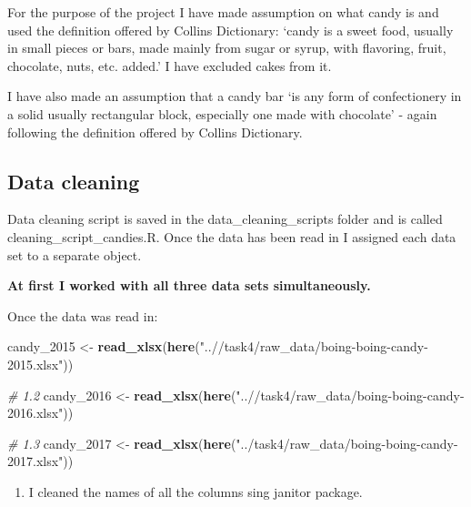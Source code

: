 \documentclass[
]{article}
\newenvironment{Shaded}{\begin{snugshade}}{\end{snugshade}}
\newcommand{\CommentTok}[1]{\textcolor[rgb]{0.56,0.35,0.01}{\textit{#1}}}
\newcommand{\FunctionTok}[1]{\textcolor[rgb]{0.13,0.29,0.53}{\textbf{#1}}}
\newcommand{\NormalTok}[1]{#1}
\newcommand{\OtherTok}[1]{\textcolor[rgb]{0.56,0.35,0.01}{#1}}
\newcommand{\StringTok}[1]{\textcolor[rgb]{0.31,0.60,0.02}{#1}}
\providecommand{\tightlist}{%
  \setlength{\itemsep}{0pt}\setlength{\parskip}{0pt}}
\begin{document}
For the purpose of the project I have made assumption on what candy is
and used the definition offered by Collins Dictionary: `candy is a sweet
food, usually in small pieces or bars, made mainly from sugar or syrup,
with flavoring, fruit, chocolate, nuts, etc. added.' I have excluded
cakes from it.

I have also made an assumption that a candy bar `is any form of
confectionery in a solid usually rectangular block, especially one made
with chocolate' - again following the definition offered by Collins
Dictionary.

\hypertarget{data-cleaning}{%
\subsection{\texorpdfstring{\textbf{Data
cleaning}}{Data cleaning}}\label{data-cleaning}}

Data cleaning script is saved in the data\_cleaning\_scripts folder and
is called cleaning\_script\_candies.R. Once the data has been read in I
assigned each data set to a separate object.

\textbf{At first I worked with all three data sets simultaneously.}

Once the data was read in:

\begin{Shaded}
\begin{Highlighting}[]
\NormalTok{candy\_2015 }\OtherTok{\textless{}{-}} \FunctionTok{read\_xlsx}\NormalTok{(}\FunctionTok{here}\NormalTok{(}\StringTok{"..//task4/raw\_data/boing{-}boing{-}candy{-}2015.xlsx"}\NormalTok{))}

\CommentTok{\# 1.2}
\NormalTok{candy\_2016 }\OtherTok{\textless{}{-}} \FunctionTok{read\_xlsx}\NormalTok{(}\FunctionTok{here}\NormalTok{(}\StringTok{"..//task4/raw\_data/boing{-}boing{-}candy{-}2016.xlsx"}\NormalTok{))}

\CommentTok{\# 1.3}
\NormalTok{candy\_2017 }\OtherTok{\textless{}{-}} \FunctionTok{read\_xlsx}\NormalTok{(}\FunctionTok{here}\NormalTok{(}\StringTok{"../task4/raw\_data/boing{-}boing{-}candy{-}2017.xlsx"}\NormalTok{))}
\end{Highlighting}
\end{Shaded}

\begin{enumerate}
\def\labelenumi{\arabic{enumi}.}
\tightlist
\item
  I cleaned the names of all the columns sing janitor package.
\end{enumerate}
\end{document}
